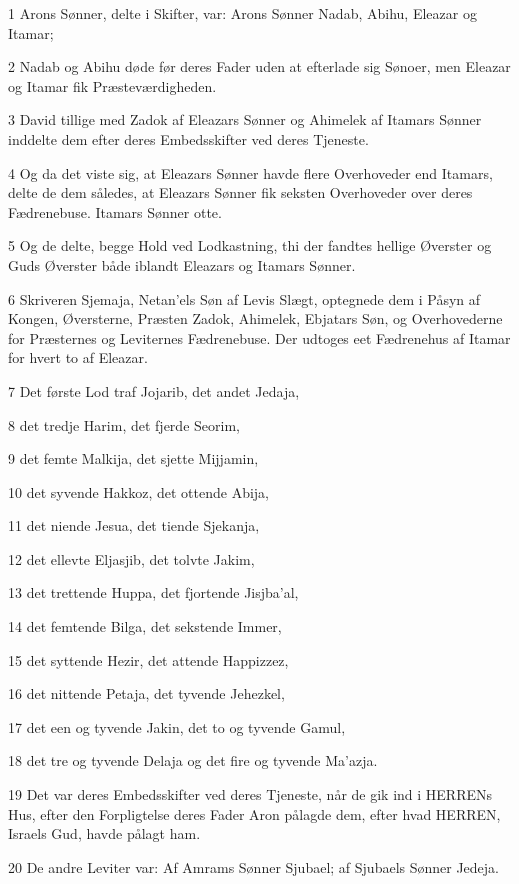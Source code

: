 \par 1 Arons Sønner, delte i Skifter, var: Arons Sønner Nadab, Abihu, Eleazar og Itamar;
\par 2 Nadab og Abihu døde før deres Fader uden at efterlade sig Sønoer, men Eleazar og Itamar fik Præsteværdigheden.
\par 3 David tillige med Zadok af Eleazars Sønner og Ahimelek af Itamars Sønner inddelte dem efter deres Embedsskifter ved deres Tjeneste.
\par 4 Og da det viste sig, at Eleazars Sønner havde flere Overhoveder end Itamars, delte de dem således, at Eleazars Sønner fik seksten Overhoveder over deres Fædrenebuse. Itamars Sønner otte.
\par 5 Og de delte, begge Hold ved Lodkastning, thi der fandtes hellige Øverster og Guds Øverster både iblandt Eleazars og Itamars Sønner.
\par 6 Skriveren Sjemaja, Netan'els Søn af Levis Slægt, optegnede dem i Påsyn af Kongen, Øversterne, Præsten Zadok, Ahimelek, Ebjatars Søn, og Overhovederne for Præsternes og Leviternes Fædrenebuse. Der udtoges eet Fædrenehus af Itamar for hvert to af Eleazar.
\par 7 Det første Lod traf Jojarib, det andet Jedaja,
\par 8 det tredje Harim, det fjerde Seorim,
\par 9 det femte Malkija, det sjette Mijjamin,
\par 10 det syvende Hakkoz, det ottende Abija,
\par 11 det niende Jesua, det tiende Sjekanja,
\par 12 det ellevte Eljasjib, det tolvte Jakim,
\par 13 det trettende Huppa, det fjortende Jisjba'al,
\par 14 det femtende Bilga, det sekstende Immer,
\par 15 det syttende Hezir, det attende Happizzez,
\par 16 det nittende Petaja, det tyvende Jehezkel,
\par 17 det een og tyvende Jakin, det to og tyvende Gamul,
\par 18 det tre og tyvende Delaja og det fire og tyvende Ma'azja.
\par 19 Det var deres Embedsskifter ved deres Tjeneste, når de gik ind i HERRENs Hus, efter den Forpligtelse deres Fader Aron pålagde dem, efter hvad HERREN, Israels Gud, havde pålagt ham.
\par 20 De andre Leviter var: Af Amrams Sønner Sjubael; af Sjubaels Sønner Jedeja.
